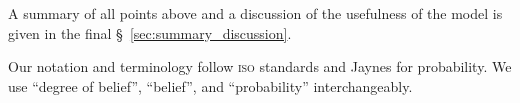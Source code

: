 \documentclass[\ifafour a4paper,12pt,\else a5paper,10pt,\fi%
onecolumn,oneside,article,%
british%
]{memoir}
\theoremstyle{remark}
\theoremstyle{innote}
\newcommand*{\citep}{\footcites}
\newcommand*{\citey}{\parencites*}
\renewcommand*{\|}{\nonscript\,\vert\nonscript\;\mathopen{}}
\newcommand*{\sect}{\S}%
\newcommand*{\puzzle}{{\fontencoding{U}\fontfamily{fontawesometwo}\selectfont\symbol{225}}}
\newcommand{\mynote}[1]{ {\color{notecolour}\puzzle\ #1}}
\newcommand*{\dob}{degree of belief}
\newcommand*{\dobs}{degrees of belief}
\begin{document}

A summary of all points above and a discussion of the usefulness of the
model is given in the final \sect~\ref{sec:summary_discussion}.

\medskip


Our notation and terminology follow \textsc{iso}
\citey{iso1993,iso2006,iso2006b} standards and Jaynes
\citey{jaynes1994_r2003} for probability. We use \enquote{\dob},
\enquote{belief}, and \enquote{probability} interchangeably.








\end{document}
